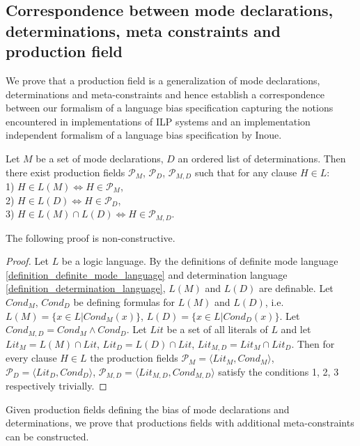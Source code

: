 \subsection{Correspondence between mode declarations, determinations, meta constraints and production field}\label{bias_correspondence}
We prove that a production field is a generalization of mode declarations, determinations and meta-constraints and hence establish a correspondence between our formalism of a language bias specification capturing the notions encountered in implementations of ILP systems and an implementation independent formalism of a language bias specification by Inoue.

\begin{proposition}\label{md_d_pf_correspondence_proposition}
Let $M$ be a set of mode declarations, $D$ an ordered list of determinations. Then there exist production fields
$\mathcal{P}_M$,
$\mathcal{P}_D$,
$\mathcal{P}_{M,D}$
such that for any clause $H \in L$:\\
1) $H \in L(M) \iff H \in \mathcal{P}_M$,\\
2) $H \in L(D) \iff H \in \mathcal{P}_D$,\\
3) $H \in L(M) \cap L(D) \iff H \in \mathcal{P}_{M,D}$.\\
\end{proposition}
The following proof is non-constructive.
\begin{proof}
Let $L$ be a logic language. By the definitions of definite mode language \ref{definition_definite_mode_language} and determination language \ref{definition_determination_language}, $L(M)$ and $L(D)$ are definable.
Let $Cond_M$, $Cond_D$ be defining formulas for $L(M)$ and $L(D)$, i.e. $L(M)=\{x \in L | Cond_M(x)\}$, $L(D)=\{x \in L | Cond_D(x)\}$.
Let $Cond_{M,D}=Cond_M \land Cond_D$. Let $Lit$ be a set of all literals of $L$ and let
$Lit_M=L(M) \cap Lit$,
$Lit_D=L(D) \cap Lit$,
$Lit_{M,D}=Lit_M \cap Lit_D$.
Then for every clause $H \in L$ the production fields
$\mathcal{P}_M=\langle Lit_M, Cond_M \rangle$,
$\mathcal{P}_D=\langle Lit_D, Cond_D \rangle$,
$\mathcal{P}_{M,D}=\langle Lit_{M,D}, Cond_{M,D} \rangle$
satisfy the conditions 1, 2, 3 respectively trivially.
\end{proof}

Given production fields defining the bias of mode declarations and determinations, we prove that productions fields with additional meta-constraints can be constructed.

